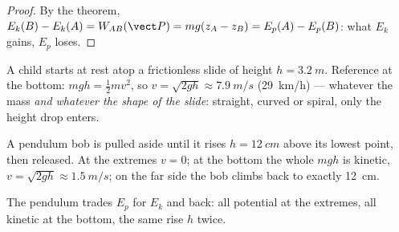 \begin{proof}
By the  theorem, $E_k(B) - E_k(A) = W_{AB}(\vect P) =
mg(z_A - z_B) = E_p(A) - E_p(B)$: what $E_k$ gains, $E_p$ loses.
\end{proof}

\begin{example}\label{ex:g11:mechanical-energy:slide}
A child starts at rest atop a frictionless slide of height
$h = \qty{3.2}{m}$. Reference at the bottom: $mgh = \tfrac12 mv^2$, so
$v = \sqrt{2gh} \approx \qty{7.9}{m/s}$ (\qty{29}{km/h}) --- whatever
the mass \emph{and whatever the shape of the slide}: straight, curved
or spiral, only the height drop enters.
\end{example}

\begin{example}[Pendulum]\label{ex:g11:mechanical-energy:pendulum}
A pendulum bob is pulled aside until it rises $h = \qty{12}{cm}$ above
its lowest point, then released. At the extremes $v = 0$; at the bottom
the whole $mgh$ is kinetic, $v = \sqrt{2gh} \approx \qty{1.5}{m/s}$;
on the far side the bob climbs back to exactly \qty{12}{cm}.
\end{example}

\begin{omfigure}

{\small The pendulum trades $E_p$ for $E_k$ and back: all potential
at the extremes, all kinetic at the bottom, the same rise $h$ twice.}
\end{omfigure}

